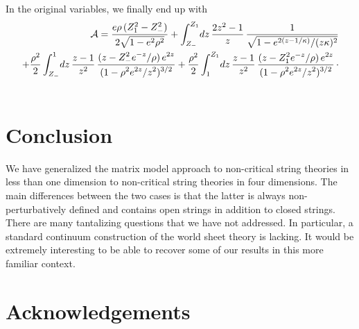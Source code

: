 \documentclass[a4paper,12pt]{article}
\begin{document}
{\begin{equation}
\end{equation}
%
In the original variables, we finally end up with
%
\begin{eqnarray}
\label{fin2}
&& \hskip -1.1cm {\cal A} =  
{e\rho\, (Z_{1}^{2} - Z_{-}^{2})\over 2\sqrt{1-e^{2}\rho^{2}}} +
\int_{Z_{-}}^{Z_{1}}\! dz\, {2z^{2}-1\over z}\,
{1\over\sqrt{1-e^{2(z-1/\kappa)}/(z\kappa)^{2}}}\nonumber\\
&&\hskip -.3cm
+ {\rho^{2}\over 2}\int_{Z_{-}}^{1}\! dz\, {z-1\over z^{2}}\,
{\displaystyle (z-Z_{-}^{2} e^{-z}/\rho )\, e^{2z}\over\displaystyle
 (1-\rho^{2} e^{2z}/z^{2})^{3/2}}
+{\rho^{2}\over 2}\int_{1}^{Z_{1}}\! dz\, {z-1\over z^{2}}\,
{\displaystyle (z-Z_{1}^{2} e^{-z}/\rho )\, e^{2z}\over \displaystyle
(1-\rho^{2} e^{2z}/z^{2})^{3/2}}
\,\cdotp\\ \nonumber
\end{eqnarray}
%
\vfill\eject
%
\section{Conclusion}
%

We have generalized the matrix model approach to non-critical string 
theories in less than one dimension \cite{DK,BK} to non-critical string 
theories in four dimensions. The main differences between the two cases is 
that the latter is always non-perturbatively defined and contains open 
strings in addition to closed strings. There are many tantalizing 
questions that we have not addressed. In particular, a standard continuum 
construction of the world sheet theory is lacking. It would be extremely 
interesting to be able to recover some of our results in this more 
familiar context.

%
\section*{Acknowledgements}
%

}
\end{document}

